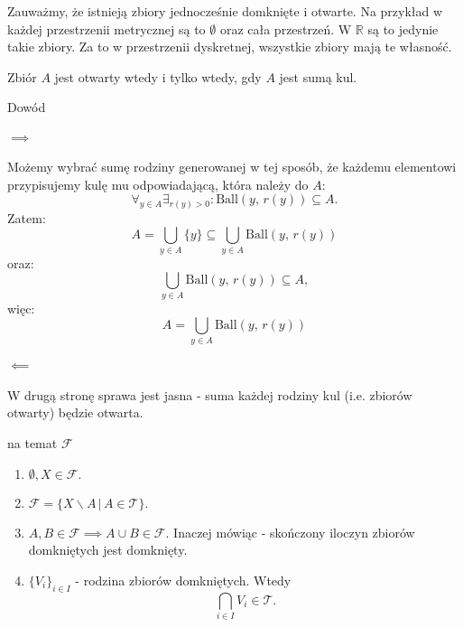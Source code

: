 \documentclass{article}
\numberwithin{defi}{section}
\numberwithin{theo}{section}
\numberwithin{defi}{section}
\newcommand{\R}{\mathbb{R}}
\newcommand{\Tau}{\mathcal{T}}
\newcommand{\Fau}{\mathcal{F}}
\newcommand{\ball}[2]{\text{Ball}(#1, \, #2)}
\begin{document}
Zauważmy, że istnieją zbiory jednocześnie domknięte i otwarte. Na przykład w każdej przestrzenii metrycznej są to $\emptyset$ oraz cała przestrzeń. W $\R$ są to jedynie takie zbiory. Za to w przestrzenii dyskretnej, wszystkie zbiory mają te własność.


\begin{twier}{}
    Zbiór $A$ jest otwarty wtedy i tylko wtedy, gdy $A$ jest sumą kul.
\end{twier}
\begin{dow}{Dowód}
    \paragraph{$\implies$} Możemy wybrać sumę rodziny generowanej w tej sposób, że każdemu elementowi przypisujemy kulę mu odpowiadającą, która należy do $A$: \begin{equation}
        \forall_{y \in A} \exists_{r(y) >0}: \ball{y}{r(y)} \subseteq A.
    \end{equation} Zatem: \begin{equation}
        A = \bigcup_{y \in A} \{ y \} \subseteq \bigcup_{y \in A} \ball{y}{r(y)}
    \end{equation} oraz: \begin{equation}
        \bigcup_{y \in A} \ball{y}{r(y)} \subseteq A,
    \end{equation} więc:\begin{equation}
        A = \bigcup_{y \in A} \ball{y}{r(y)}
    \end{equation}

    \paragraph{$\impliedby$} W drugą stronę sprawa jest jasna - suma każdej rodziny kul (i.e. zbiorów otwarty) będzie otwarta.
\end{dow}

\begin{obs}{na temat $\Fau$}
    \begin{enumerate}
        \item $\emptyset, X \in \Fau.$
        \item $\Fau = \{ X \backslash A \, \big| \, A \in \Tau \}.$
        \item $A, B \in \Fau \implies A \cup B \in \Fau.$ Inaczej mówiąc - skończony iloczyn zbiorów domkniętych jest domknięty.
        \item $\{V_i\}_{i \in I}$ - rodzina zbiorów domkniętych. Wtedy \begin{equation}
                  \bigcap_{i \in I} V_i \in \Tau.
              \end{equation}
    \end{enumerate}
\end{obs}
\end{document}
